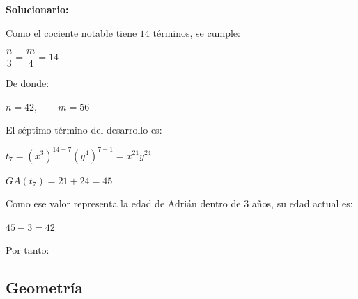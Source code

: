 \begin{enumerate}[resume]
	\vspace{2mm}
	\textbf{Solucionario:}
	
	Como el cociente notable tiene $14$ términos, se cumple:
	
	$\dfrac{n}{3}=\dfrac{m}{4}=14$
	
	De donde:
	
	$n=42,\qquad m=56$
	
	El séptimo término del desarrollo es:
	
	$t_7=(x^3)^{14-7}(y^4)^{7-1}=x^{21}y^{24}$
	
	
	$GA(t_7)=21+24=45$
	
	Como ese valor representa la edad de Adrián dentro de $3$ años, su edad actual es:
	
	$45-3=42$
	
	Por tanto:
	
	
	\vspace{6mm}
	
\end{enumerate}

\subsection*{Geometría}

